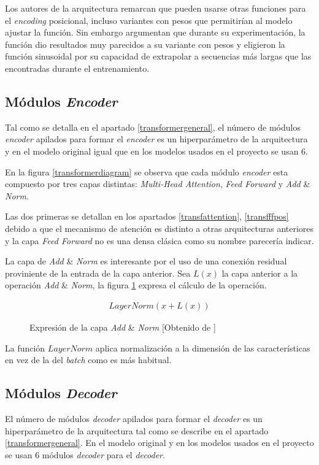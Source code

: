 Los autores de la arquitectura remarcan que pueden usarse otras funciones para el \textit{encoding} posicional, incluso variantes con pesos que permitirían al modelo ajustar la función. Sin embargo argumentan que durante su experimentación, la función dio resultados muy parecidos a su variante con pesos y eligieron la función sinusoidal por su capacidad de extrapolar a secuencias más largas que las encontradas durante el entrenamiento.

\subsection{Módulos \textit{Encoder}}
Tal como se detalla en el apartado \ref{transformergeneral}, el número de módulos \textit{encoder} apilados para formar el \textit{encoder} es un hiperparámetro de la arquitectura y en el modelo original igual que en los modelos usados en el proyecto se usan 6.

En la figura \ref{transformerdiagram} se observa que cada módulo \textit{encoder} esta compuesto por tres capas distintas: \textit{Multi-Head Attention}, \textit{Feed Forward} y \textit{Add} \& \textit{Norm}.

Las dos primeras se detallan en los apartados \ref{transfattention}, \ref{transfffpos} debido a que el mecanismo de atención es distinto a otras arquitecturas anteriores y la capa \textit{Feed Forward} no es una densa clásica como su nombre parecería indicar. 

La capa de \textit{Add} \& \textit{Norm} es interesante por el uso de una conexión residual \cite{He2015Dec} proviniente de la entrada de la capa anterior. Sea $L(x)$ la capa anterior a la operación \textit{Add} \& \textit{Norm}, la figura \ref{transformeraddnorm} expresa el cálculo de la operación.

\begin{figure}[H]
    \begin{align*}
        LayerNorm(x + L(x))
    \end{align*}
    \caption{Expresión de la capa \textit{Add} \& \textit{Norm} [Obtenido de \cite{Vaswani2017Jun}]}\label{transformeraddnorm}
\end{figure}

La función $LayerNorm$ \cite{Ba2016Jul} aplica normalización a la dimensión de las características en vez de la del \textit{batch} como es más habitual.

\subsection{Módulos \textit{Decoder}}
El número de módulos \textit{decoder} apilados para formar el \textit{decoder} es un hiperparámetro de la arquitectura tal como se describe en el apartado \ref{transformergeneral}. En el modelo original y en los modelos usados en el proyecto se usan 6 módulos \textit{decoder} para el \textit{decoder}.

